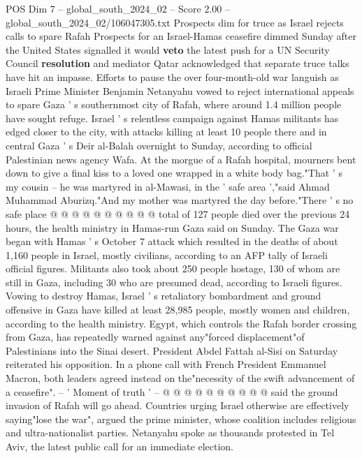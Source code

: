 \begin{textsample}{POS Dim 7 – global\_south\_2024\_02 – Score 2.00 – global\_south\_2024\_02/106047305.txt}  \label{ex:f7_pos_058}
Prospects dim for truce as Israel rejects calls to spare Rafah Prospects for an Israel-Hamas ceasefire dimmed Sunday after the United States signalled it would \textbf{veto} the latest push for a UN Security Council \textbf{resolution} and mediator Qatar acknowledged that separate truce talks have hit an impasse.
Efforts to pause the over four-month-old war languish as Israeli Prime Minister Benjamin Netanyahu vowed to reject international appeals to spare Gaza ' s southernmost city of Rafah, where around 1.4 million people have sought refuge.
Israel ' s relentless campaign against Hamas militants has edged closer to the city, with attacks killing at least 10 people there and in central Gaza ' s Deir al-Balah overnight to Sunday, according to official Palestinian news agency Wafa.
At the morgue of a Rafah hospital, mourners bent down to give a final kiss to a loved one wrapped in a white body bag."That ' s my cousin -- he was martyred in al-Mawasi, in the ' safe area ',"said Ahmad Muhammad Aburizq."And my mother was martyred the day before."There ' s no safe place @ @ @ @ @ @ @ @ @ @ total of 127 people died over the previous 24 hours, the health ministry in Hamas-run Gaza said on Sunday.
The Gaza war began with Hamas ' s October 7 attack which resulted in the deaths of about 1,160 people in Israel, mostly civilians, according to an AFP tally of Israeli official figures.
Militants also took about 250 people hostage, 130 of whom are still in Gaza, including 30 who are presumed dead, according to Israeli figures.
Vowing to destroy Hamas, Israel ' s retaliatory bombardment and ground offensive in Gaza have killed at least 28,985 people, mostly women and children, according to the health ministry.
Egypt, which controls the Rafah border crossing from Gaza, has repeatedly warned against any"forced displacement"of Palestinians into the Sinai desert.
President Abdel Fattah al-Sisi on Saturday reiterated his opposition.
In a phone call with French President Emmanuel Macron, both leaders agreed instead on the"necessity of the swift advancement of a ceasefire". -- ' Moment of truth ' -- @ @ @ @ @ @ @ @ @ @ said the ground invasion of Rafah will go ahead.
Countries urging Israel otherwise are effectively saying"lose the war", argued the prime minister, whose coalition includes religious and ultra-nationalist parties.
Netanyahu spoke as thousands protested in Tel Aviv, the latest public call for an immediate election.

\end{textsample}
